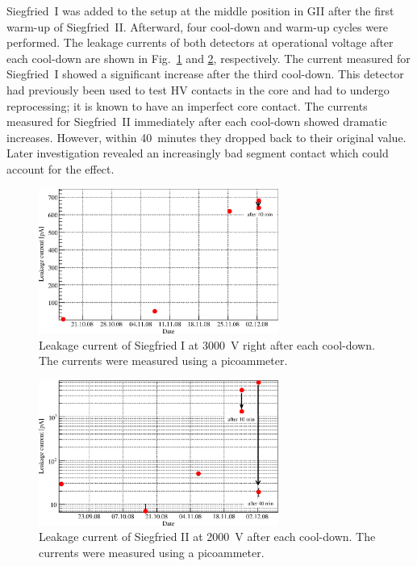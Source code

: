 Siegfried~I was added to the setup at the middle position in GII after
the first warm-up of Siegfried~II. Afterward, four cool-down and
warm-up cycles were performed. The leakage currents of both detectors
at operational voltage after each cool-down are shown in
Fig.~\ref{fig:ii:lcs1} and \ref{fig:ii:lcs2}, respectively. The
current measured for Siegfried~I showed a significant increase after
the third cool-down. This detector had previously been used to test HV
contacts in the core and had to undergo reprocessing; it is known to
have an imperfect core contact. The currents measured for
Siegfried~II immediately after each cool-down showed dramatic
increases. However, within 40~minutes they dropped back to their
original value. Later investigation revealed an increasingly bad
segment contact which could account for the effect.

\begin{figure}[htbp]
\centering
\includegraphics[width=0.7\textwidth]{LCs1}
\caption{Leakage current of Siegfried I at 3000~V right after each
cool-down. The currents were measured using a picoammeter.}
\label{fig:ii:lcs1}
\end{figure}

\begin{figure}[htbp]
\centering
\includegraphics[width=0.7\textwidth, clip]{LCs2}
\caption{Leakage current of Siegfried II at 2000~V after each
cool-down. The currents were measured using a picoammeter.}
\label{fig:ii:lcs2}
\end{figure}

